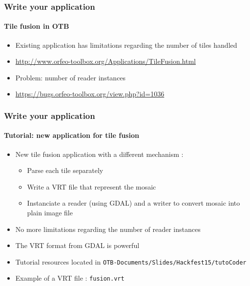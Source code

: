 \documentclass[8pt]{beamer}
\begin{document}
\begin{frame}
\frametitle{Write your  application}
\framesubtitle{Tile fusion in OTB}
\begin{itemize}
\item Existing application has limitations regarding the number of tiles handled
\item \url{http://www.orfeo-toolbox.org/Applications/TileFusion.html}
\item Problem: number of reader instances
\item \url{https://bugs.orfeo-toolbox.org/view.php?id=1036}
\end{itemize}
\end{frame}

\begin{frame}
\frametitle{Write your  application}
\framesubtitle{Tutorial: new application for tile fusion}
\begin{itemize}
\item New tile fusion application with a different mechanism :
\begin{itemize}
\item Parse each tile separately
\item Write a VRT file that represent the mosaic
\item Instanciate a reader (using GDAL) and a writer to convert mosaic into plain image file
\end{itemize}
\item No more limitations regarding the number of reader instances
\item The VRT format from GDAL is powerful
\item Tutorial resources located in \texttt{OTB-Documents/Slides/Hackfest15/tutoCoder}
\item Example of a VRT file : \texttt{fusion.vrt}
\end{itemize}
\end{frame}
\end{document}
